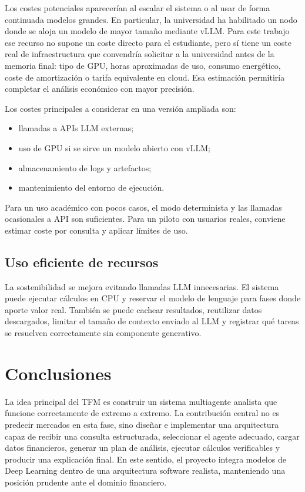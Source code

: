 \documentclass[11pt,a4paper]{article}
\let\oldsection\section
\renewcommand{\section}{\clearpage\oldsection}
\begin{document}
Los costes potenciales aparecer\'ian al escalar el sistema o al usar de forma continuada modelos grandes. En particular, la universidad ha habilitado un nodo donde se aloja un modelo de mayor tama\~no mediante vLLM. Para este trabajo ese recurso no supone un coste directo para el estudiante, pero s\'i tiene un coste real de infraestructura que convendr\'ia solicitar a la universidad antes de la memoria final: tipo de GPU, horas aproximadas de uso, consumo energ\'etico, coste de amortizaci\'on o tarifa equivalente en cloud. Esa estimaci\'on permitir\'ia completar el an\'alisis econ\'omico con mayor precisi\'on.

Los costes principales a considerar en una versi\'on ampliada son:

\begin{itemize}
    \item llamadas a APIs LLM externas;
    \item uso de GPU si se sirve un modelo abierto con vLLM;
    \item almacenamiento de logs y artefactos;
    \item mantenimiento del entorno de ejecuci\'on.
\end{itemize}

Para un uso acad\'emico con pocos casos, el modo determinista y las llamadas ocasionales a API son suficientes. Para un piloto con usuarios reales, conviene estimar coste por consulta y aplicar l\'imites de uso.

\subsection{Uso eficiente de recursos}

La sostenibilidad se mejora evitando llamadas LLM innecesarias. El sistema puede ejecutar c\'alculos en CPU y reservar el modelo de lenguaje para fases donde aporte valor real. Tambi\'en se puede cachear resultados, reutilizar datos descargados, limitar el tama\~no de contexto enviado al LLM y registrar qu\'e tareas se resuelven correctamente sin componente generativo.

\section{Conclusiones}

La idea principal del TFM es construir un sistema multiagente analista que funcione correctamente de extremo a extremo. La contribuci\'on central no es predecir mercados en esta fase, sino dise\~nar e implementar una arquitectura capaz de recibir una consulta estructurada, seleccionar el agente adecuado, cargar datos financieros, generar un plan de an\'alisis, ejecutar c\'alculos verificables y producir una explicaci\'on final. En este sentido, el proyecto integra modelos de Deep Learning dentro de una arquitectura software realista, manteniendo una posici\'on prudente ante el dominio financiero.
\end{document}
